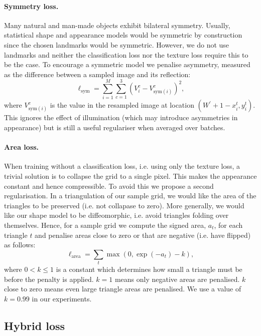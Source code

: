 \documentclass[runningheads]{llncs}
\begin{document}
\paragraph{Symmetry loss.}
Many natural and man-made objects exhibit bilateral symmetry. Usually, statistical shape and appearance models would be symmetric by construction since the chosen landmarks would be symmetric. However, we do not use landmarks and neither the classification loss nor the texture loss require this to be the case. To encourage a symmetric model we penalise asymmetry, measured as the difference between a sampled image and its reflection:
\begin{equation}
    \ell_{\textrm{sym}} = \sum_{i=1}^M \sum_{c=1}^3 (V_i^c - V_{\textrm{sym}(i)}^c)^2,
\end{equation}
where $V_{\textrm{sym}(i)}^c$ is the value in the resampled image at location $(W^{\prime}+1-x_i^t,y_i^t)$.
This ignores the effect of illumination (which may introduce asymmetries in appearance) but is still a useful regulariser when averaged over batches.

\paragraph{Area loss.}
When training without a classification loss, i.e. using only the texture loss, a trivial solution is to collapse the grid to a single pixel. This makes the appearance constant and hence compressible. To avoid this we propose a second regularisation. In a triangulation of our sample grid, we would like the area of the triangles to be preserved (i.e. not collapase to zero). More generally, we would like our shape model to be diffeomorphic, i.e. avoid triangles folding over themselves. Hence, for a sample grid we compute the signed area, $a_t$, for each triangle $t$ and penalise areas close to zero or that are negative (i.e. have flipped) as follows:
\begin{equation}
    \ell_{\textrm{area}} = \sum_t \max(0,\exp(-a_t)-k),
\end{equation}
where $0< k\leq 1$ is a constant which determines how small a triangle must be before the penalty is applied. $k=1$ means only negative areas are penalised. $k$ close to zero means even large triangle areas are penalised. We use a value of $k=0.99$ in our experiments.

\subsection{Hybrid loss}
\end{document}
